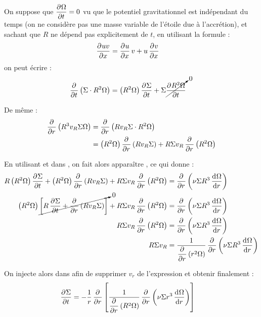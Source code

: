 \bigskip

On suppose que $\mathinner{ \dfrac{\partial{^{}}\Omega}{\partial{{t}^{}}} }=0$ vu que le potentiel gravitationnel est indépendant du temps (on ne considère pas une masse variable de l'étoile due à l'accrétion), et sachant que $R$ ne dépend pas explicitement de $t$, en utilisant la formule : 
\begin{align*}
\mathinner{ \dfrac{\partial{^{}}uv}{\partial{{x}^{}}} } &= \mathinner{ \dfrac{\partial{^{}}u}{\partial{{x}^{}}} }v + u\mathinner{ \dfrac{\partial{^{}}v}{\partial{{x}^{}}} }
\end{align*}
on peut écrire :
\begin{align}
\mathinner{ \dfrac{\partial{^{}}}{\partial{{t}^{}}} }\left(\Sigma\cdot R^2\Omega\right) &= \left(R^2\Omega\right)\mathinner{ \dfrac{\partial{^{}}\Sigma}{\partial{{t}^{}}} } + \Sigma\cancelto{0}{\mathinner{ \dfrac{\partial{^{}}R^2\Omega}{\partial{{t}^{}}} }}\label{eq:ang_mom_tmp_01}
\end{align}

De même : 
\begin{align}
\dpd{}{r}\left(R^3 v_R \Sigma \Omega\right) &= \dpd{}{r}\left(R v_R \Sigma \cdot R^2\Omega\right)\nonumber\\
&= \left(R^2\Omega\right)\dpd{}{r}\left(R v_R \Sigma\right) + R \Sigma v_R \dpd{}{r}\left(R^2\Omega\right)\label{eq:ang_mom_tmp_02}
\end{align}

En utilisant  et  dans , on fait alors apparaître , ce qui donne : 
\begin{align}
R\left(R^2\Omega\right)\dpd{\Sigma}{t} + \left(R^2\Omega\right)\dpd{}{r}\left(R v_R \Sigma\right) + R \Sigma v_R \dpd{}{r}\left(R^2\Omega\right) &= \dpd{}{r}\left(\nu \Sigma R^3 \dod{\Omega}{r}\right)\nonumber\\
\left(R^2\Omega\right)\cancelto{0}{\left[R\dpd{\Sigma}{t} + \dpd{}{r}\left(R v_R \Sigma\right)\right]} + R \Sigma v_R \dpd{}{r}\left(R^2\Omega\right) &= \dpd{}{r}\left(\nu \Sigma R^3 \dod{\Omega}{r}\right)\nonumber\\
R \Sigma v_R \dpd{}{r}\left(R^2\Omega\right) &= \dpd{}{r}\left(\nu \Sigma R^3 \dod{\Omega}{r}\right)\nonumber\\
R \Sigma v_R &= \inv{\dpd{}{r}\left(r^2\Omega\right)} \dpd{}{r}\left(\nu \Sigma R^3 \dod{\Omega}{r}\right)\label{eq:r_sigma_vr}
\end{align}

\bigskip

On injecte alors  dans  afin de supprimer $v_r$ de l'expression et obtenir finalement : 
\begin{align*}
\mathinner{ \dfrac{\partial{^{}}\Sigma}{\partial{{t}^{}}} } &= -\frac{1}{r}\mathinner{ \dfrac{\partial{^{}}}{\partial{{r}^{}}} }\left[\frac{1}{\mathinner{ \dfrac{\partial{^{}}}{\partial{{r}^{}}} }\left(R^2\Omega\right)} \mathinner{ \dfrac{\partial{^{}}}{\partial{{r}^{}}} }\left(\nu \Sigma r^3 \mathinner{ \dfrac{\operatorname{d \!}{^{}}\Omega}{\operatorname{d \!}{{r}^{}}} }\right)\right]
\end{align*}

